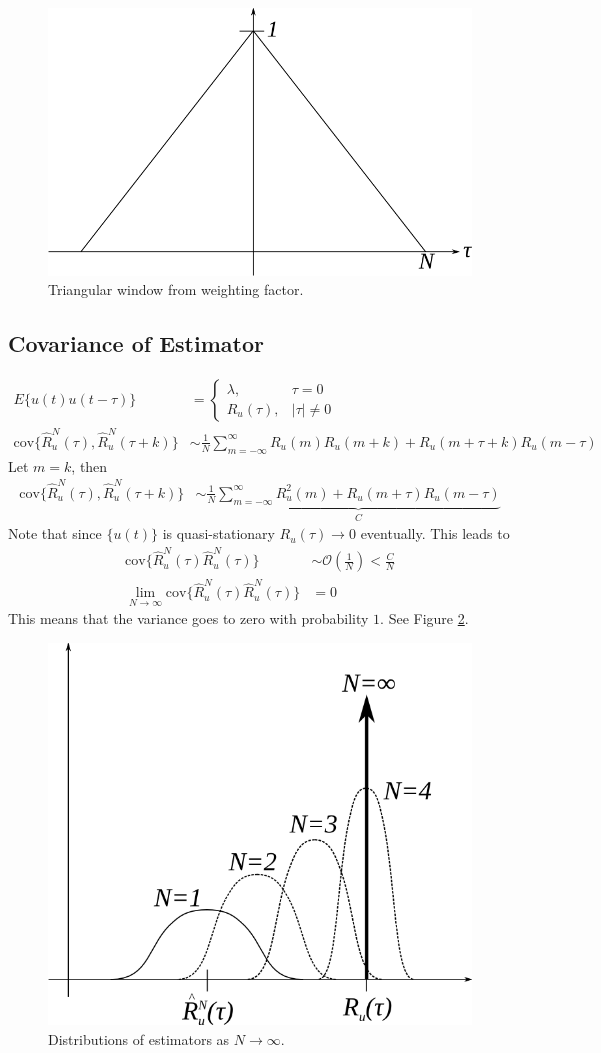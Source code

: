\documentclass[lecture,12pt,]{pcms-l}
\theoremstyle{example}
\newcommand{\ruhat}{\hat{R}_u^N(\tau)}
\begin{document}
\begin{figure}[ht!]
	\centering
	\includegraphics[width=.3\textwidth]{images/05triWindow}
	\caption{Triangular window from weighting factor.}
	\label{fig:05triWindow}
\end{figure}

\subsection{Covariance of Estimator}
\begin{align*}
E\{u(t)u(t-\tau)\} &= \begin{cases} \lambda, & \tau=0 \\ R_u(\tau), & |\tau|\neq 0 \end{cases} \\
\text{cov}\{\ruhat,\hat{R}_u^N(\tau+k)\} &\sim \frac{1}{N}\sum_{m=-\infty}^\infty R_u(m)R_u(m+k) + R_u(m+\tau+k)R_u(m-\tau)
\end{align*}
Let $m=k$, then
\begin{align*}
\text{cov}\{\ruhat,\hat{R}_u^N(\tau+k)\} &\sim \frac{1}{N}\underbrace{\sum_{m=-\infty}^\infty R_u^2(m) + R_u(m+\tau)R_u(m-\tau)}_C
\end{align*}
Note that since $\{u(t)\}$ is quasi-stationary $R_u(\tau)\to0$ eventually. This leads to
\begin{align*}
\text{cov}\{\ruhat\ruhat\} &\sim \mathcal{O}(\frac{1}{N}) < \frac{C}{N} \\
\lim_{N\to\infty}\text{cov}\{\ruhat\ruhat\} &= 0
\end{align*}
This means that the variance goes to zero with probability $1$. See Figure \ref{fig:05estDist}.
\begin{figure}[ht!]
	\centering
	\includegraphics[width=.4\textwidth]{images/05estDist}
	\caption{Distributions of estimators as $N\to\infty$.}
	\label{fig:05estDist}
\end{figure}
\end{document}
